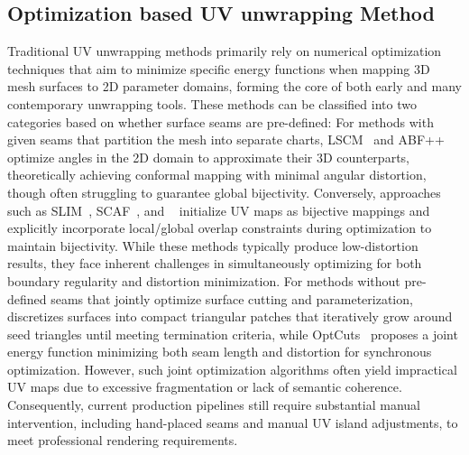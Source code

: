 \documentclass{article}
\begin{document}
\subsection{Optimization based UV unwrapping Method}
Traditional UV unwrapping methods primarily rely on numerical optimization techniques that aim to minimize specific energy functions when mapping 3D mesh surfaces to 2D parameter domains, forming the core of both early and many contemporary unwrapping tools. These methods can be classified into two categories based on whether surface seams are pre-defined: For methods with given seams that partition the mesh into separate charts, LSCM~\cite{levy2023least} and ABF++~\cite{sheffer2005abf++} optimize angles in the 2D domain to approximate their 3D counterparts, theoretically achieving conformal mapping with minimal angular distortion, though often struggling to guarantee global bijectivity. Conversely, approaches such as SLIM~\cite{rabinovich2017scalable}, SCAF~\cite{jiang2017simplicial}, and ~\cite{smith2015bijective} initialize UV maps as bijective mappings and explicitly incorporate local/global overlap constraints during optimization to maintain bijectivity. While these methods typically produce low-distortion results, they face inherent challenges in simultaneously optimizing for both boundary regularity and distortion minimization. For methods without pre-defined seams that jointly optimize surface cutting and parameterization, ~\cite{sorkine2002bounded} discretizes surfaces into compact triangular patches that iteratively grow around seed triangles until meeting termination criteria, while OptCuts~\cite{li2018optcuts} proposes a joint energy function minimizing both seam length and distortion for synchronous optimization. However, such joint optimization algorithms often yield impractical UV maps due to excessive fragmentation or lack of semantic coherence. Consequently, current production pipelines still require substantial manual intervention, including hand-placed seams and manual UV island adjustments, to meet professional rendering requirements.
\end{document}
